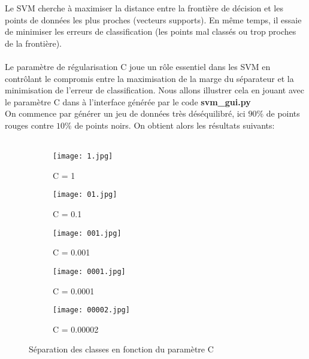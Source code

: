\documentclass{article}
\begin{document}
Le SVM cherche à maximiser la distance entre la frontière de décision et les points de données les plus proches (vecteurs supports).
En même temps, il essaie de minimiser les erreurs de classification (les points mal classés ou trop proches de la frontière).
\\
\\
Le paramètre de régularisation C joue un rôle essentiel dans les SVM en contrôlant le compromis entre la maximisation de la marge du séparateur et la minimisation de l’erreur de classification.
Nous allons illustrer cela en jouant avec le paramètre C dans à l'interface générée par le code \textbf{svm\_gui.py} 
\\ 
On commence par générer un jeu de données très déséquilibré, ici $90 \%$ de points rouges contre $10 \%$ de points noirs. On obtient alors les résultats suivants:
\\
\\
\begin{figure}[htbp]
    \centering
    \captionsetup{justification=centering}
    \begin{subfigure}{0.3\textwidth}
        \centering
        \texttt{[image: 1.jpg]}
        \caption{C = 1}
    \end{subfigure}
    \hfill
    \begin{subfigure}{0.3\textwidth}
        \centering
        \texttt{[image: 01.jpg]}
        \caption{C = 0.1}
        \end{subfigure}
    \hfill
    \begin{subfigure}{0.3\textwidth}
        \centering
        \texttt{[image: 001.jpg]}
        \caption{C = 0.001}    
        \end{subfigure}

\vspace{.5cm}
        
    \begin{subfigure}{0.45\textwidth}
        \centering
        \texttt{[image: 0001.jpg]}
        \caption{C = 0.0001}    

    \end{subfigure}
    \begin{subfigure}{0.45\textwidth}
        \centering
    \texttt{[image: 00002.jpg]}
    \caption{C = 0.00002}
    \label{fig:enter-label}
    \end{subfigure}
    \caption{Séparation des classes en fonction du paramètre C}
\end{figure}
\end{document}
